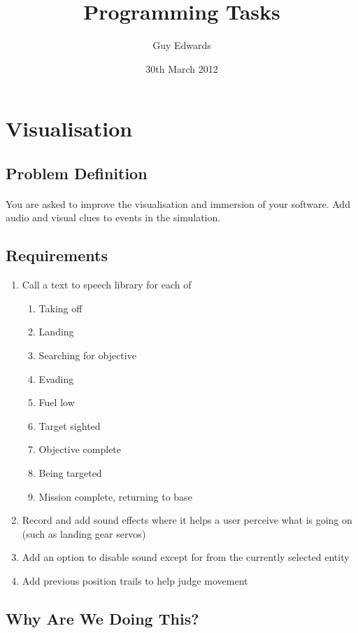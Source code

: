 \documentclass[11pt]{book}
\title{\textbf{Programming Tasks}}
\author{Guy Edwards}
\date{30th March 2012}
\begin{document}
\section{Visualisation}

\subsection{Problem Definition}

\paragraph{} You are asked to improve the visualisation and immersion of your software. Add audio and visual clues to events in the simulation.

\subsection{Requirements}

\begin{enumerate}
\item Call a text to speech library for each of
    \begin{enumerate}
    \item Taking off
    \item Landing
    \item Searching for objective
    \item Evading
    \item Fuel low
    \item Target sighted
    \item Objective complete
    \item Being targeted
    \item Mission complete, returning to base
    \end{enumerate}
\item Record and add sound effects where it helps a user perceive what is going on (such as landing gear servos)
\item Add an option to disable sound except for from the currently selected entity
\item Add previous position trails to help judge movement
\end{enumerate}

\subsection{Why Are We Doing This?}
\end{document}
